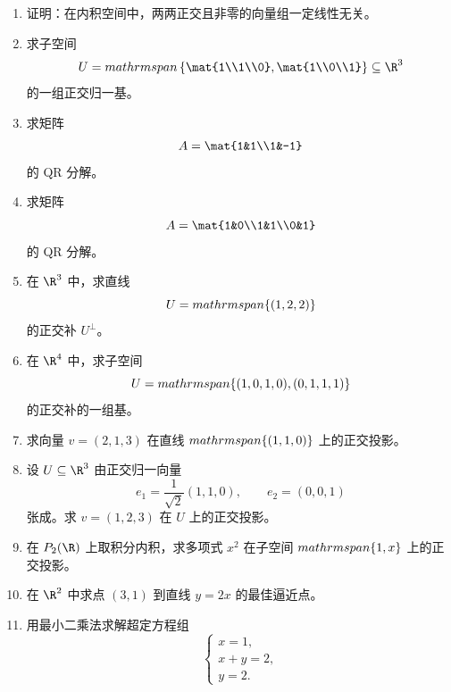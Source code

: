 \begin{enumerate}[label=\textbf{5.\arabic*.}]
  \item \basic 证明：在内积空间中，两两正交且非零的向量组一定线性无关。

  \item \basic 求子空间
  \[
  U=\\mathrm{span}\left\{\mat{1\\1\\0},\mat{1\\0\\1}\right\}\subseteq \R^3
  \]
  的一组正交归一基。

  \item \basic 求矩阵
  \[
  A=\mat{1&1\\1&-1}
  \]
  的 QR 分解。

  \item \basic 求矩阵
  \[
  A=\mat{1&0\\1&1\\0&1}
  \]
  的 QR 分解。

  \item \basic 在 $\R^3$ 中，求直线
  \[
  U=\\mathrm{span}\{(1,2,2)\}
  \]
  的正交补 $U^{\perp}$。

  \item \basic 在 $\R^4$ 中，求子空间
  \[
  U=\\mathrm{span}\{(1,0,1,0),(0,1,1,1)\}
  \]
  的正交补的一组基。

  \item \basic 求向量 $v=(2,1,3)$ 在直线 $\\mathrm{span}\{(1,1,0)\}$ 上的正交投影。

  \item \basic 设 $U\subseteq \R^3$ 由正交归一向量
  \[
  e_1=\frac{1}{\sqrt2}(1,1,0),\qquad e_2=(0,0,1)
  \]
  张成。求 $v=(1,2,3)$ 在 $U$ 上的正交投影。

  \item \basic 在 $P_2(\R)$ 上取积分内积，求多项式 $x^2$ 在子空间 $\\mathrm{span}\{1,x\}$ 上的正交投影。

  \item \basic 在 $\R^2$ 中求点 $(3,1)$ 到直线 $y=2x$ 的最佳逼近点。

  \item \basic 用最小二乘法求解超定方程组
  \[
  \begin{cases}
  x=1,\\
  x+y=2,\\
  y=2.
  \end{cases}
  \]


\end{enumerate}
